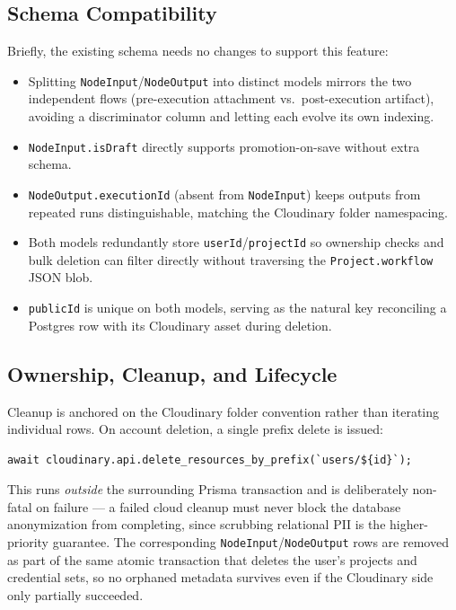 \subsection{Schema Compatibility}

Briefly, the existing schema needs no changes to support this feature:

\begin{itemize}
  \item Splitting \texttt{NodeInput}/\texttt{NodeOutput} into distinct models mirrors the two independent flows (pre-execution attachment vs.\ post-execution artifact), avoiding a discriminator column and letting each evolve its own indexing.
  \item \texttt{NodeInput.isDraft} directly supports promotion-on-save without extra schema.
  \item \texttt{NodeOutput.executionId} (absent from \texttt{NodeInput}) keeps outputs from repeated runs distinguishable, matching the Cloudinary folder namespacing.
  \item Both models redundantly store \texttt{userId}/\texttt{projectId} so ownership checks and bulk deletion can filter directly without traversing the \texttt{Project.workflow} JSON blob.
  \item \texttt{publicId} is unique on both models, serving as the natural key reconciling a Postgres row with its Cloudinary asset during deletion.
\end{itemize}

\subsection{Ownership, Cleanup, and Lifecycle}
\label{subsec:lifecycle}

Cleanup is anchored on the Cloudinary folder convention rather than iterating individual rows. On account deletion, a single prefix delete is issued:

\begin{lstlisting}
await cloudinary.api.delete_resources_by_prefix(`users/${id}`);
\end{lstlisting}

This runs \emph{outside} the surrounding Prisma transaction and is deliberately non-fatal on failure — a failed cloud cleanup must never block the database anonymization from completing, since scrubbing relational PII is the higher-priority guarantee. The corresponding \texttt{NodeInput}/\texttt{NodeOutput} rows are removed as part of the same atomic transaction that deletes the user's projects and credential sets, so no orphaned metadata survives even if the Cloudinary side only partially succeeded.